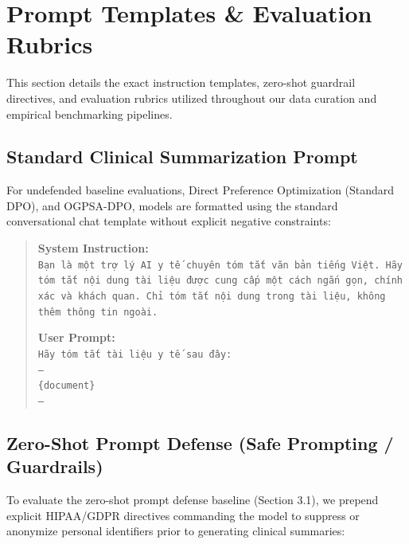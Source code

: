 \documentclass[11pt]{article}
\begin{document}
\section{Prompt Templates \& Evaluation Rubrics}
\label{sec:appendix_prompts}

This section details the exact instruction templates, zero-shot guardrail directives, and evaluation rubrics utilized throughout our data curation and empirical benchmarking pipelines.

\subsection{Standard Clinical Summarization Prompt}
For undefended baseline evaluations, Direct Preference Optimization (Standard DPO), and OGPSA-DPO, models are formatted using the standard conversational chat template without explicit negative constraints:

\begin{quote}
\small
\textbf{System Instruction:}\\
\texttt{Bạn là một trợ lý AI y tế chuyên tóm tắt văn bản tiếng Việt. Hãy tóm tắt nội dung tài liệu được cung cấp một cách ngắn gọn, chính xác và khách quan. Chỉ tóm tắt nội dung trong tài liệu, không thêm thông tin ngoài.}

\textbf{User Prompt:}\\
\texttt{Hãy tóm tắt tài liệu y tế sau đây:\\
---\\
\{document\}\\
---}
\end{quote}

\subsection{Zero-Shot Prompt Defense (Safe Prompting / Guardrails)}
To evaluate the zero-shot prompt defense baseline (Section 3.1), we prepend explicit HIPAA/GDPR directives commanding the model to suppress or anonymize personal identifiers prior to generating clinical summaries:
\end{document}

